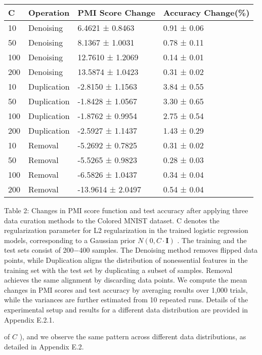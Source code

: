 \begin{longtable}[]{@{}|l|l|l|l|@{}}
\toprule\noalign{}
\endhead
\bottomrule\noalign{}
\endlastfoot
\hline
C & Operation & PMI Score Change & Accuracy Change(\%) \\
\hline
10 & Denoising & 6.4621 ± 0.8463 & 0.91 ± 0.06 \\
\hline
50 & Denoising & 8.1367 ± 1.0031 & 0.78 ± 0.11 \\
\hline
100 & Denoising & 12.7610 ± 1.2069 & 0.14 ± 0.01 \\
\hline
200 & Denoising & 13.5874 ± 1.0423 & 0.31 ± 0.02 \\
\hline
10 & Duplication & -2.8150 ± 1.1563 & 3.84 ± 0.55 \\
\hline
50 & Duplication & -1.8428 ± 1.0567 & 3.30 ± 0.65 \\
\hline
100 & Duplication & -1.8762 ± 0.9954 & 2.75 ± 0.54 \\
\hline
200 & Duplication & -2.5927 ± 1.1437 & 1.43 ± 0.29 \\
\hline
10 & Removal & -5.2692 ± 0.7825 & 0.31 ± 0.02 \\
\hline
50 & Removal & -5.5265 ± 0.9823 & 0.28 ± 0.03 \\
\hline
100 & Removal & -6.5826 ± 1.0437 & 0.34 ± 0.04 \\
\hline
200 & Removal & -13.9614 ± 2.0497 & 0.54 ± 0.04 \\
\hline
\end{longtable}

Table 2: Changes in PMI score function and test accuracy after applying
three data curation methods to the Colored MNIST dataset. C denotes the
regularization parameter for L2 regularization in the trained logistic
regression models, corresponding to a Gaussian prior
\(N ( 0 , C \cdot \mathbf { I } )\) . The training and the test sets
consist of 200−400 samples. The Denoising method removes flipped data
points, while Duplication aligns the distribution of nonessential
features in the training set with the test set by duplicating a subset
of samples. Removal achieves the same alignment by discarding data
points. We compute the mean changes in PMI scores and test accuracy by
averaging results over 1,000 trials, while the variances are further
estimated from 10 repeated runs. Details of the experimental setup and
results for a different data distribution are provided in Appendix
E.2.1.

of \(C\) ), and we observe the same pattern across different data
distributions, as detailed in Appendix E.2.

